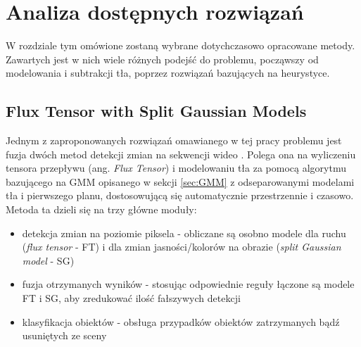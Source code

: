 \chapter{Analiza dostępnych rozwiązań}
\label{cha:analiza}

W rozdziale tym omówione zostaną wybrane dotychczasowo opracowane metody. Zawartych jest w nich wiele różnych podejść do problemu, począwszy od modelowania i subtrakcji tła, poprzez rozwiązań bazujących na heurystyce.


\section{Flux Tensor with Split Gaussian Models}
\label{sec:FTSG}

Jednym z zaproponowanych rozwiązań omawianego w tej pracy problemu jest fuzja dwóch metod detekcji zmian na sekwencji wideo \cite{6910016}. Polega ona na wyliczeniu tensora przepływu (ang. \textit{Flux Tensor}) i modelowaniu tła za pomocą algorytmu bazującego na GMM opisanego w sekcji \ref{sec:GMM} z odseparowanymi modelami tła i pierwszego planu, dostosowującą się automatycznie przestrzennie i czasowo.
Metoda ta dzieli się na trzy główne moduły:
\begin{itemize}
\item detekcja zmian na poziomie piksela - obliczane są osobno modele dla ruchu (\textit{flux tensor} - FT) i dla zmian jasności/kolorów na obrazie (\textit{split Gaussian model} - SG)
\item fuzja otrzymanych wyników - stosując odpowiednie reguły łączone są modele FT i SG, aby zredukować ilość fałszywych detekcji
\item klasyfikacja obiektów - obsługa przypadków obiektów zatrzymanych bądź usuniętych ze sceny
\end{itemize}
